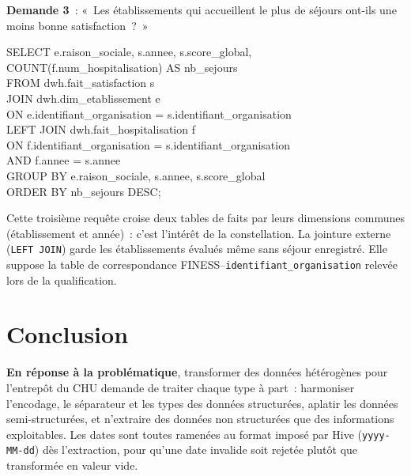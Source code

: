 \noindent \textbf{Demande 3}~: «~Les établissements qui accueillent le plus de séjours ont-ils une moins bonne satisfaction~?~»

\begin{center}
\begin{minipage}{0.92\textwidth}
\begin{tcolorbox}[colback=title2!6,colframe=title1,boxsep=2pt]
\ttfamily\scriptsize
SELECT e.raison\_sociale, s.annee, s.score\_global,\\
\hspace*{3.2em}COUNT(f.num\_hospitalisation) AS nb\_sejours\\
FROM dwh.fait\_satisfaction s\\
JOIN dwh.dim\_etablissement e\\
\hspace*{2em}ON e.identifiant\_organisation = s.identifiant\_organisation\\
LEFT JOIN dwh.fait\_hospitalisation f\\
\hspace*{2em}ON f.identifiant\_organisation = s.identifiant\_organisation\\
\hspace*{2em}AND f.annee = s.annee\\
GROUP BY e.raison\_sociale, s.annee, s.score\_global\\
ORDER BY nb\_sejours DESC;
\end{tcolorbox}
\end{minipage}
\end{center}

\noindent Cette troisième requête croise deux tables de faits par leurs dimensions communes (établissement et année)~: c'est l'intérêt de la constellation. La jointure externe (\texttt{LEFT JOIN}) garde les établissements évalués même sans séjour enregistré. Elle suppose la table de correspondance FINESS--\texttt{identifiant\_\allowbreak organisation} relevée lors de la qualification.

\newpage
\section*{Conclusion}
{}

\noindent \textbf{En réponse à la problématique}, transformer des données hétérogènes pour l'entrepôt du CHU demande de traiter chaque type à part~: harmoniser l'encodage, le séparateur et les types des données structurées, aplatir les données semi-structurées, et n'extraire des données non structurées que des informations exploitables. Les dates sont toutes ramenées au format imposé par Hive (\texttt{yyyy-MM-dd}) dès l'extraction, pour qu'une date invalide soit rejetée plutôt que transformée en valeur vide.

